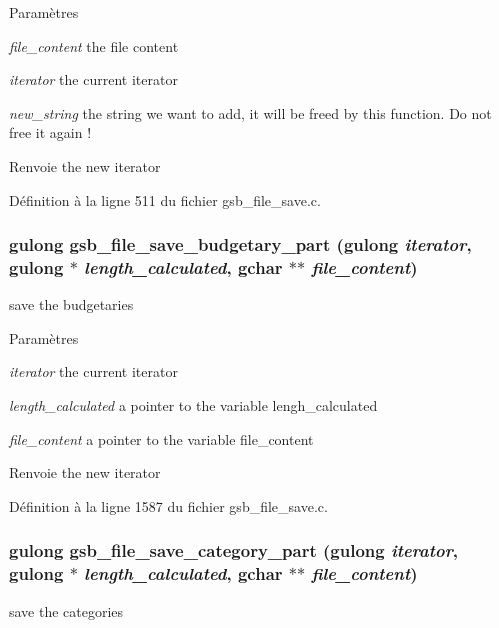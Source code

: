 \begin{DoxyParams}{Paramètres}
\item[{\em file\_\-content}]the file content \item[{\em iterator}]the current iterator \item[{\em new\_\-string}]the string we want to add, it will be freed by this function. Do not free it again !\end{DoxyParams}
\begin{DoxyReturn}{Renvoie}
the new iterator 
\end{DoxyReturn}


Définition à la ligne 511 du fichier gsb\_\-file\_\-save.c.

\subsubsection[{gsb\_\-file\_\-save\_\-budgetary\_\-part}]{\setlength{\rightskip}{0pt plus 5cm}gulong gsb\_\-file\_\-save\_\-budgetary\_\-part (gulong {\em iterator}, \/  gulong $\ast$ {\em length\_\-calculated}, \/  gchar $\ast$$\ast$ {\em file\_\-content})}\label{gsb__file__save_8h_a46e773fc842889454bd36ed6e93ac4af}
save the budgetaries


\begin{DoxyParams}{Paramètres}
\item[{\em iterator}]the current iterator \item[{\em length\_\-calculated}]a pointer to the variable lengh\_\-calculated \item[{\em file\_\-content}]a pointer to the variable file\_\-content\end{DoxyParams}
\begin{DoxyReturn}{Renvoie}
the new iterator 
\end{DoxyReturn}


Définition à la ligne 1587 du fichier gsb\_\-file\_\-save.c.

\subsubsection[{gsb\_\-file\_\-save\_\-category\_\-part}]{\setlength{\rightskip}{0pt plus 5cm}gulong gsb\_\-file\_\-save\_\-category\_\-part (gulong {\em iterator}, \/  gulong $\ast$ {\em length\_\-calculated}, \/  gchar $\ast$$\ast$ {\em file\_\-content})}\label{gsb__file__save_8h_af255442e956aa95c1b2c223b4cd07481}
save the categories


